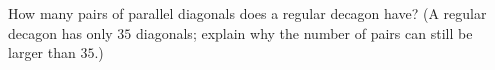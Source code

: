 How many pairs of parallel diagonals does a regular decagon have? (A regular decagon has only $35$ diagonals; explain why the number of pairs can still be larger than $35$.)
